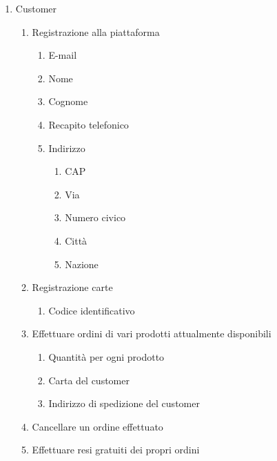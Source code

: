 \documentclass[12pt]{report}
\begin{document}
    \begin{enumerate}
        \item Customer
            \begin{enumerate}
                \item Registrazione alla piattaforma
                    \begin{enumerate}
                        \item E-mail
                        \item Nome
                        \item Cognome
                        \item Recapito telefonico
                        \item Indirizzo
                            \begin{enumerate}
                                \item CAP
                                \item Via
                                \item Numero civico
                                \item Città
                                \item Nazione
                            \end{enumerate}
                    \end{enumerate}
                \item Registrazione carte
                    \begin{enumerate}
                        \item Codice identificativo
                    \end{enumerate}
                \item Effettuare ordini di vari prodotti attualmente disponibili
                    \begin{enumerate}
                        \item Quantità per ogni prodotto
                        \item Carta del customer
                        \item Indirizzo di spedizione del customer
                    \end{enumerate}
                \item Cancellare un ordine effettuato
                \item Effettuare resi gratuiti dei propri ordini
                    \begin{enumerate}

\end{enumerate}
\end{enumerate}
\end{enumerate}
\end{document}
